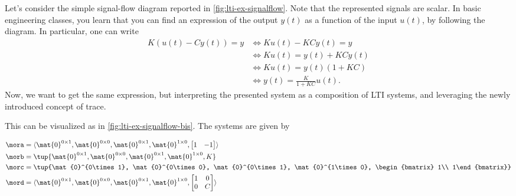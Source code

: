     \begin{example}
        Let's consider the simple signal-flow diagram reported in \cref{fig:lti-ex-signalflow}.
        Note that the represented signals are scalar.
        In basic engineering classes, you learn that you can find an expression of the output $y(t)$ as a function of the input $u(t)$, by following the diagram.
        In particular, one can write
        \begin{equation}
            \label{eq:lti-input-output-gain}
            \begin{aligned}
                K(u(t)-Cy(t))=y & \Leftrightarrow Ku(t)-KCy(t)=y \\
                                & \Leftrightarrow Ku(t)=y(t)+KCy(t) \\
                                & \Leftrightarrow Ku(t)=y(t)(1+KC) \\
                                & \Leftrightarrow y(t)=\frac{K}{1+KC}u(t).
            \end{aligned}
        \end{equation}
        Now, we want to get the same expression, but interpreting the presented system as a composition of LTI systems, and leveraging the newly introduced concept of trace.

        This can be visualized as in \cref{fig:lti-ex-signalflow-bis}.
        The systems are given by

        \begin{equation*}
            \begin{aligned}
                \mora & = \langle\mat{0}^{0\times 1}, \mat{0}^{0\times 0}, \mat{0}^{0\times 1}, \mat{0}^{1\times 0}, \begin{bmatrix} {1} & {-1}\end{bmatrix}\rangle \\
                \morb & =\tup{\mat{0}^{0\times 1}, \mat{0}^{0\times 0}, \mat{0}^{0\times 1}, \mat{0}^{1\times 0}, K} \\
                \morc & =\tup{\mat{0}^{0\times 1}, \mat{0}^{0\times 0}, \mat{0}^{0\times 1}, \mat{0}^{1\times 0}, \begin{bmatrix} 1\\ 1\end{bmatrix}} \\
                \mord & =\langle\mat{0}^{0\times 1}, \mat{0}^{0\times 0}, \mat{0}^{0\times 1}, \mat{0}^{1\times 0},
                \begin{bmatrix}
                    1 & 0 \\
                    0 & C
                \end{bmatrix}\rangle
            \end{aligned}
        \end{equation*}


\end{example}
